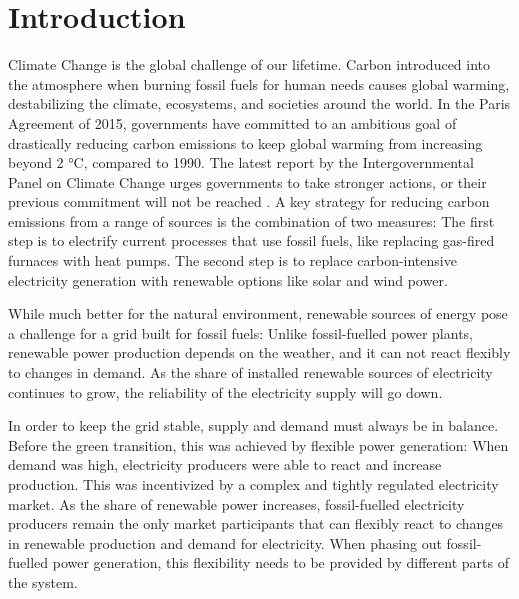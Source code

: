 
\chapter{Introduction}\label{Introduction}
Climate Change is the global challenge of our lifetime. Carbon introduced into the atmosphere when burning fossil fuels for human needs causes global warming, destabilizing the climate, ecosystems, and societies around the world.
In the Paris Agreement of 2015, governments have committed to an ambitious goal of drastically reducing carbon emissions to keep global warming from increasing beyond 2 °C, compared to 1990.
The latest report by the Intergovernmental Panel on Climate Change  urges governments to take stronger actions, or their previous commitment will not be reached \citep{portner2022ClimateChange2022}.
A key strategy for reducing carbon emissions from a range of sources is the combination of two measures: The first step is to electrify current processes that use fossil fuels, like replacing gas-fired furnaces with heat pumps. The second step is to replace carbon-intensive electricity generation with renewable options like solar and wind power.

While much better for the natural environment, renewable sources of energy pose a challenge for a grid built for fossil fuels:
Unlike fossil-fuelled power plants, renewable power production depends on the weather, and it can not react flexibly to changes in demand.
As the share of installed renewable sources of electricity continues to grow, the reliability of the electricity supply will go down.

In order to keep the grid stable, supply and demand must always be in balance. Before the green transition, this was achieved by flexible power generation: When demand was high, electricity producers were able to react and increase production.
This was incentivized by a complex and tightly regulated electricity market.
As the share of renewable power increases, fossil-fuelled electricity producers remain the only market participants that can flexibly react to changes in renewable production and demand for electricity.
When phasing out fossil-fuelled power generation, this flexibility needs to be provided by different parts of the system.

